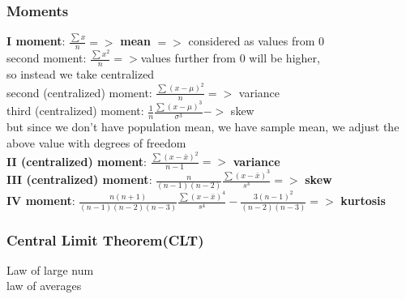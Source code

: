 \documentclass{beamer}
\begin{document}
\begin{frame}\frametitle{Moments}
	\textbf{I moment}: $\frac{\sum x}{n} =>$ \textbf{mean} $=>$ considered as values from 0\\
	second moment: $\frac{\sum x^2}{n} => $values further from 0 will be higher, \\so instead we take centralized \\
	second (centralized) moment: $\frac{\sum (x-\mu)^2}{n} =>$ variance\\
	third (centralized) moment: $\frac{1}{n} \frac{\sum (x-\mu)^3}{\sigma ^3} ->$ skew\\
	but since we don't have population mean, we have sample mean, we adjust the above value with degrees of freedom\\
	\textbf{II (centralized) moment}: $\frac{\sum (x-\bar{x})^2}{n-1} =>$ \textbf{variance}\\
	\textbf{III (centralized) moment}: $\frac{n}{(n-1)(n-2)} \frac{\sum (x-\bar{x})^3}{s^3} =>$ \textbf{skew}\\
	\textbf{IV moment}: $\frac{n(n+1)}{(n-1)(n-2)(n-3)} \frac{\sum (x-\bar{x})^4}{s^4}-\frac{3(n-1)^2}{(n-2)(n-3)} =>$ \textbf{kurtosis}\\
	
\end{frame}


\begin{frame}\frametitle{Central Limit Theorem(CLT)}
	Law of large num \\ law of averages\\
\end{frame}
\end{document}
